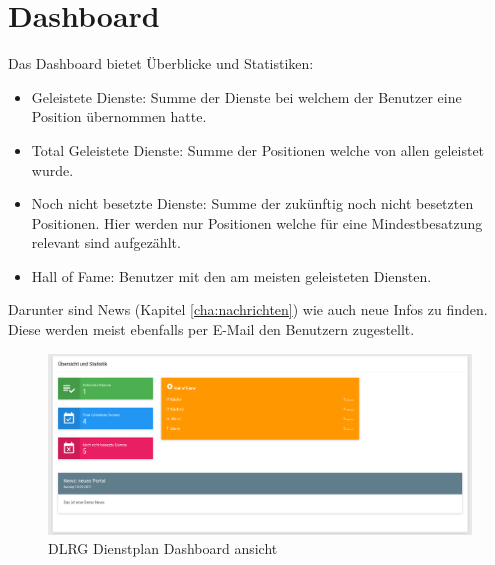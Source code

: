 \chapter{Dashboard}
\label{cha:dashboard}

Das Dashboard bietet Überblicke und Statistiken:

\begin{itemize}
\item Geleistete Dienste: Summe der Dienste bei welchem der Benutzer eine Position übernommen hatte.
\item Total Geleistete Dienste: Summe der Positionen welche von allen geleistet wurde.
\item Noch nicht besetzte Dienste: Summe der zukünftig noch nicht besetzten Positionen. Hier werden nur Positionen welche für eine Mindestbesatzung relevant sind aufgezählt.
\item Hall of Fame: Benutzer mit den am meisten geleisteten Diensten. 
\end{itemize}

\noindent Darunter sind News (Kapitel \ref{cha:nachrichten}) wie auch neue Infos zu finden. Diese werden meist ebenfalls per E-Mail den Benutzern zugestellt.

\begin{figure}[h]
 \begin{addmargin}{-0.2\linewidth}
   \centering 
   \includegraphics[width=20cm]{Bilder/view_overview.png}
 \end{addmargin} 
 \caption[Dashboard ansicht]{DLRG Dienstplan Dashboard ansicht}
 \label{fig:view_overview}
\end{figure}